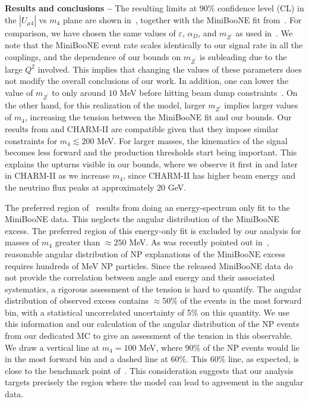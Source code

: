 {\bf Results and conclusions --}
The resulting limits at 90\% confidence level (CL)  in the $|U_{\mu 4}|$ vs $m_4$ plane are shown in~, together with the MiniBooNE fit from~\cite{Bertuzzo:2018itn}. For comparison, we have chosen the same values of $\varepsilon$, $\alpha_D$, and $m_{Z^\prime}$ as used in~\cite{Bertuzzo:2018itn}. 
We note that the MiniBooNE event rate scales identically to our signal rate in all the couplings, and the dependence of our bounds on $m_{Z^\prime}$ is subleading due to the large $Q^2$ involved. 
This implies that changing the values of these parameters does not modify the overall conclusions of our work. In addition, one can lower the value of $m_{Z^\prime}$ to only around $10$ MeV before hitting beam dump constraints~\cite{Bauer:2018onh}. 
On the other hand, for this realization of the model, larger $m_{Z^\prime}$ implies larger values of $m_4$, increasing the tension between the MiniBooNE fit and our bounds.
Our results from \minerva and CHARM-II are compatible given that 
they impose similar constraints for $m_4 \lesssim 200 $ MeV. For larger masses, the kinematics of the signal becomes less forward and the production thresholds start being important. This explains the upturns visible in our bounds, where we observe it first in \minerva and later in CHARM-II as we increase $m_4$, since CHARM-II has higher beam energy and the neutrino flux peaks at approximately 20 GeV.

The preferred region of~\cite{Bertuzzo:2018itn} results from doing an energy-spectrum only fit to the MiniBooNE data. This neglects the angular distribution of the MiniBooNE excess. The preferred region of this energy-only fit is excluded by our analysis for masses of $m_4$ greater than $\approx 250$ MeV. As was recently pointed out in~\cite{Jordan:2018qiy}, reasonable angular distribution of NP explanations of the MiniBooNE excess requires hundreds of MeV NP particles.
Since the released MiniBooNE data do not provide the correlation between angle and energy and their associated systematics, a rigorous assessment of the tension is hard to quantify. The angular distribution of observed excess contains $\approx 50\%$ of the events in the most forward bin, with a statistical uncorrelated uncertainty of 5\% on this quantity.
We use this information and our calculation of the angular distribution of the NP events from our dedicated MC to give an assessment of the tension in this observable. We draw a vertical line at $m_4 = 100$ MeV, where 90\% of the NP events would lie in the most forward bin and a dashed line at 60\%. 
This 60\% line, as expected, is close to the benchmark point of~\cite{Bertuzzo:2018ftf}. This consideration suggests that our analysis targets precisely the region where the model can lead to agreement in the angular data. 

